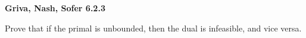 \textbf{Griva, Nash, Sofer 6.2.3}

Prove that if the primal is unbounded, then the dual is infeasible, and vice versa.

\begin{solution}
  \ \\
  \vfill
\end{solution}

